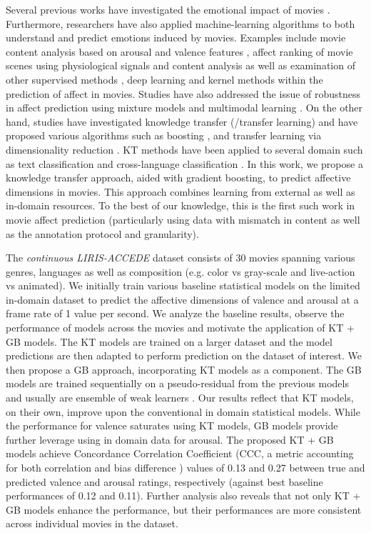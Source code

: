 \documentclass{article}
\begin{document}
Several previous works have investigated the emotional impact of movies \cite{bartsch2010predicting, carroll2010movies}. 
Furthermore, researchers have also applied machine-learning algorithms to both understand and predict emotions induced by movies.
Examples include movie content analysis based on arousal and valence features \cite{xu2008hierarchical}, affect ranking of movie scenes using physiological signals and content analysis \cite{soleymani2008affective} as well as examination of other supervised methods \cite{malandrakis2011supervised}, deep learning and kernel methods \cite{baveye2015deep} within the prediction of affect in movies.
Studies have also addressed the issue of robustness in affect prediction using mixture models \cite{goyal2016multimodal} and multimodal learning \cite{pang2015mutlimodal}. 
On the other hand, studies have investigated knowledge transfer (/transfer learning) and have proposed various algorithms such as boosting \cite{dai2007boosting}, and transfer learning via dimensionality reduction \cite{pan2008transfer}.
KT methods have been applied to several domain such as text classification \cite{dai2007transferring} and cross-language classification \cite{ling2008can}.   
In this work, we propose a knowledge transfer approach, aided with gradient boosting, to predict affective dimensions in movies.  
This approach combines learning from external as well as in-domain resources.
To the best of our knowledge, this is the first such work in movie affect prediction (particularly using data with mismatch in content as well as the annotation protocol and granularity). 

The {\it continuous LIRIS-ACCEDE} dataset consists of 30 movies spanning various genres, languages as well as composition (e.g. color vs gray-scale and live-action vs animated).
We initially train various baseline statistical models on the limited in-domain dataset to predict the affective dimensions of valence and arousal at a frame rate of 1 value per second.
We analyze the baseline results, observe the performance of models across the movies and motivate the application of KT + GB models.
The KT models are trained on a larger dataset and the model predictions are then adapted to perform prediction on the dataset of interest.
We then propose a GB approach, incorporating KT models as a component.
The GB models are trained sequentially on a pseudo-residual from the previous models and usually are ensemble of weak learners \cite{friedman2001greedy}. 
Our results reflect that KT models, on their own, improve upon the conventional in domain statistical models.
While the performance for valence saturates using KT models, GB models provide further leverage using in domain data for arousal.
The proposed KT + GB models achieve Concordance Correlation Coefficient (CCC, a metric accounting for both correlation and bias difference \cite{liao2000note,valstar2016avec}) values of 0.13 and 0.27 between true and predicted valence and arousal ratings, respectively (against best baseline performances of 0.12 and 0.11).
Further analysis also reveals that not only KT + GB models enhance the performance, but their performances are more consistent across individual movies in the dataset.
\end{document}

